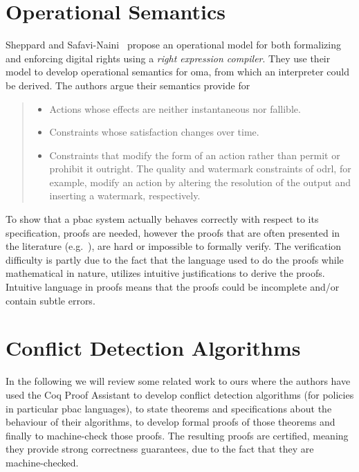\section{Operational Semantics}
Sheppard and Safavi-Naini~\cite{SheppardS09} propose an operational model for both formalizing and enforcing digital rights using a \emph{right expression compiler}. They use their model to develop operational semantics for \ac{oma}, from which an interpreter could be derived. The authors argue their semantics provide for 
\begin{quote}
\begin{itemize}
  \item Actions whose effects are neither instantaneous nor fallible.
  \item Constraints whose satisfaction changes over time.
  \item Constraints that modify the form of an action rather than permit or prohibit it outright. The quality and watermark constraints
of \ac{odrl}, for example, modify an action by altering the resolution of the output and inserting a watermark, respectively.
\end{itemize}
\end{quote}


To show that a \ac{pbac} system actually behaves correctly with respect to its specification, proofs are needed, however the proofs that are often presented in the literature (e.g.~\cite{Halpern2008, pucella2006, Tschantz}), are hard or impossible to formally verify. The verification difficulty is partly due to the fact that the language used to do the proofs while mathematical in nature, utilizes intuitive justifications to derive the proofs. Intuitive language in proofs means that the proofs could be incomplete and/or contain subtle errors. 

\section{Conflict Detection Algorithms}

In the following we will review some related work to ours where the authors have used the Coq Proof Assistant to develop conflict detection algorithms (for policies in particular \ac{pbac} languages), to state theorems and specifications about the behaviour of their algorithms, to develop formal proofs of those theorems and finally to machine-check those proofs. The resulting proofs are certified, meaning they provide strong correctness guarantees, due to the fact that they are machine-checked.

